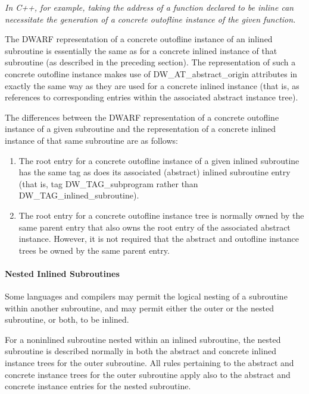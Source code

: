 \textit{In C++, for example, taking the address of a function declared
to be inline can necessitate the generation of a concrete
out\dash of\dash line instance of the given function.}

The DWARF representation of a concrete out\dash of\dash line instance
of an inlined subroutine is essentially the same as for a
concrete inlined instance of that subroutine (as described in
the preceding section). The representation of such a concrete
out\dash of\dash line instance makes use of DW\_AT\_abstract\_origin
attributes in exactly the same way as they are used for
a concrete inlined instance (that is, as references to
corresponding entries within the associated abstract instance
tree).

The differences between the DWARF representation of a
concrete out\dash of\dash line instance of a given subroutine and the
representation of a concrete inlined instance of that same
subroutine are as follows:

\begin{enumerate}[1.]
\item  The root entry for a concrete out\dash of\dash line instance
of a given inlined subroutine has the same tag as does its
associated (abstract) inlined subroutine entry (that is, tag
DW\_TAG\_subprogram rather than DW\_TAG\_inlined\_subroutine).

\item The root entry for a concrete out\dash of\dash line instance tree
is normally owned by the same parent entry that also owns
the root entry of the associated abstract instance. However,
it is not required that the abstract and out\dash of\dash line instance
trees be owned by the same parent entry.

\end{enumerate}

\paragraph{Nested Inlined Subroutines}
\label{nestedinlinedsubroutines}
Some languages and compilers may permit the logical nesting of
a subroutine within another subroutine, and may permit either
the outer or the nested subroutine, or both, to be inlined.

For a non\dash inlined subroutine nested within an inlined
subroutine, the nested subroutine is described normally in
both the abstract and concrete inlined instance trees for
the outer subroutine. All rules pertaining to the abstract
and concrete instance trees for the outer subroutine apply
also to the abstract and concrete instance entries for the
nested subroutine.

